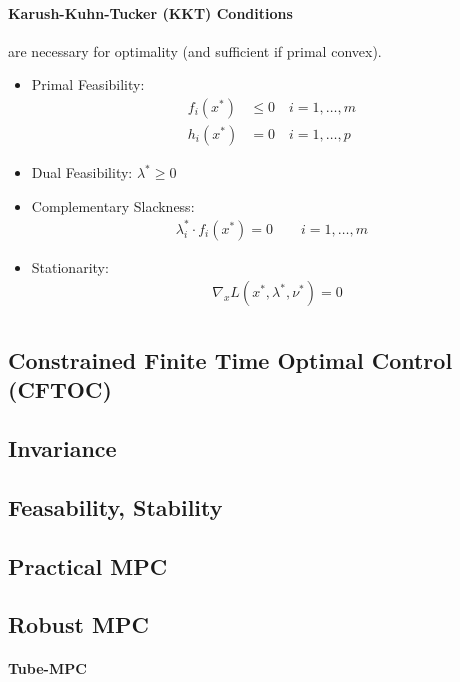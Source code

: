 \documentclass[landscape,a4paper,8pt]{scrartcl}
\begin{document}
\begin{multicols*}{3}
\paragraph{Karush-Kuhn-Tucker (KKT) Conditions}
are necessary for optimality (and sufficient if primal convex).
\begin{itemize}
	\item Primal Feasibility:
		\begin{align*}
			f_i(x^*) &\leq 0 \quad i=1,\dots,m\\
			h_i(x^*) &=0 \quad i=1,\dots,p
		\end{align*}
	\item Dual Feasibility:  $\lambda^* \geq 0$
	\item Complementary Slackness:
		\begin{align*}
			\lambda_i^* \cdot f_i(x^*) = 0 \quad \quad i=1,\dots,m
		\end{align*}
	\item Stationarity:
		\begin{align*}
			&\nabla_x L(x^*,\lambda^*,\nu^*) =0 \\
		\end{align*}
\end{itemize}

\subsection{Constrained Finite Time Optimal Control (CFTOC)}

\subsection{Invariance}
\subsection{Feasability, Stability}

\subsection{Practical MPC}
\subsection{Robust MPC}
\paragraph{Tube-MPC}


\end{multicols*}
\end{document}
